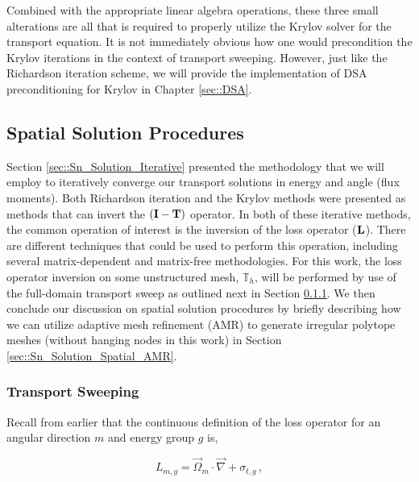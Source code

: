 Combined with the appropriate linear algebra operations, these three small alterations are all that is required to properly utilize the Krylov solver for the transport equation. It is not immediately obvious how one would precondition the Krylov iterations in the context of transport sweeping. However, just like the Richardson iteration scheme, we will provide the implementation of DSA preconditioning for Krylov in Chapter \ref{sec::DSA}.

\subsection{Spatial Solution Procedures}
\label{sec::Sn_Solution_Spatial}

Section \ref{sec::Sn_Solution_Iterative} presented the methodology that we will employ to iteratively converge our transport solutions in energy and angle (flux moments). Both Richardson iteration and the Krylov methods were presented as methods that can invert the $({\bf I} - {\bf T})$ operator. In both of these iterative methods, the common operation of interest is the inversion of the loss operator (${\bf L}$). There are different techniques that could be used to perform this operation, including several matrix-dependent and matrix-free methodologies. For this work, the loss operator inversion on some unstructured mesh, $\mathbb{T}_h$, will be performed by use of the full-domain transport sweep as outlined next in Section \ref{sec::Sn_Solution_Spatial_Sweeping}. We then conclude our discussion on spatial solution procedures by briefly describing how we can utilize adaptive mesh refinement (AMR) to generate irregular polytope meshes (without hanging nodes in this work) in Section \ref{sec::Sn_Solution_Spatial_AMR}.

\subsubsection{Transport Sweeping}
\label{sec::Sn_Solution_Spatial_Sweeping}

Recall from earlier that the continuous definition of the loss operator for an angular direction $m$ and energy group $g$ is,

\begin{equation}
\label{sec::Sn_Solution_Spatial_loss_op}
L_{m,g} =  \vec{\Omega}_m \cdot   \vec{\nabla} + \sigma_{t,g} \,  ,
\end{equation}


